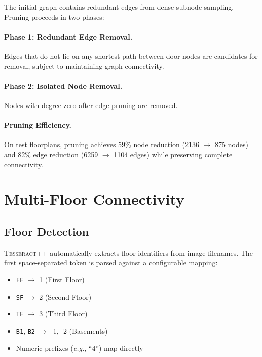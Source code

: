 \documentclass[manuscript,screen,review]{acmart}
\newcommand{\tesseract}{\textsc{Tesseract++}}
\newcommand{\eg}{\textit{e.g.}}
\begin{document}
The initial graph contains redundant edges from dense subnode sampling. Pruning proceeds in two phases:

\paragraph{Phase 1: Redundant Edge Removal.} Edges that do not lie on any shortest path between door nodes are candidates for removal, subject to maintaining graph connectivity.

\paragraph{Phase 2: Isolated Node Removal.} Nodes with degree zero after edge pruning are removed.


\paragraph{Pruning Efficiency.} On test floorplans, pruning achieves 59\% node reduction (2136 $\rightarrow$ 875 nodes) and 82\% edge reduction (6259 $\rightarrow$ 1104 edges) while preserving complete connectivity.

\section{Multi-Floor Connectivity}
\label{sec:multi_floor}

\subsection{Floor Detection}
\label{subsec:floor_detection}

\tesseract{} automatically extracts floor identifiers from image filenames. The first space-separated token is parsed against a configurable mapping:

\begin{itemize}
    \item \texttt{FF} $\rightarrow$ 1 (First Floor)
    \item \texttt{SF} $\rightarrow$ 2 (Second Floor)
    \item \texttt{TF} $\rightarrow$ 3 (Third Floor)
    \item \texttt{B1}, \texttt{B2} $\rightarrow$ -1, -2 (Basements)
    \item Numeric prefixes (\eg, ``4'') map directly
\end{itemize}
\end{document}
